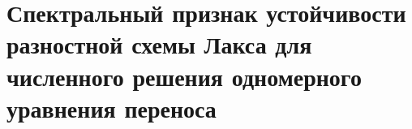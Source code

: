 \documentclass[__main__.tex]{subfiles}
\begin{document}
\section{Спектральный признак устойчивости разностной схемы Лакса для численного решения одномерного уравнения переноса}
\end{document}
